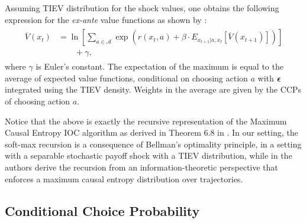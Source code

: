 \documentclass{article}
\renewcommand{\vec}[1]{\mbox{\bm{$#1$}}}
\begin{document}
Assuming TIEV distribution for the shock values, one obtains the following expression for the \emph{ex-ante} value functions as shown by \cite{rust_gmc}:
\begin{align} \label{eq:exanterust}
\begin{split}
\overline{V}(x_t) &=\ln\left[\sum_{a\in\mathcal{A}} \exp\left(r(x_t,a)+\beta \cdot E_{x_{t+1}|a,x_t} \left[ \overline{V}(x_{t+1}) \right] \right)\right] \\
& \qquad +\gamma,
\end{split}
\end{align}
where $\gamma$ is Euler's constant. The expectation of the maximum is equal to the average of expected value functions, conditional on choosing action $a$ with $\vec{\epsilon}$ integrated using the TIEV density. Weights in the average are given by the CCPs of choosing action $a$.


Notice that the above is exactly the recursive representation of the Maximum Causal Entropy IOC algorithm as derived in Theorem 6.8 in \cite{ziebart_phd}. In our setting, the soft-max recursion is a consequence of Bellman's optimality principle, in a setting with a separable stochastic payoff shock with a TIEV distribution, while in \cite{ziebart_phd} the authors derive the recursion from an information-theoretic perspective that enforces a maximum causal entropy distribution over trajectories.

\subsection{Conditional Choice Probability}

\end{document}
